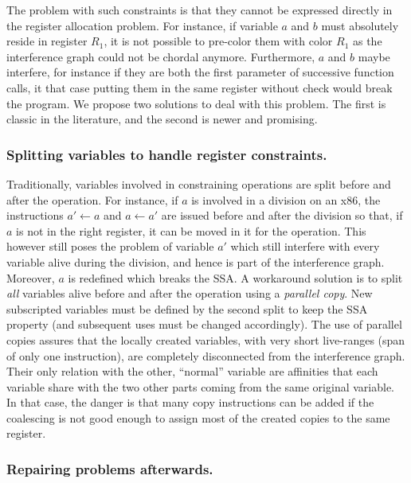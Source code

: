 {The problem with such constraints is that they cannot be expressed directly in 
the register allocation problem. For instance, if variable $a$ and $b$ must 
absolutely reside in register $R_1$, it is not possible to pre-color them with 
color $R_1$ as the interference graph could not be chordal anymore.  
Furthermore, $a$ and $b$ maybe interfere, for instance if they are both the 
first parameter of successive function calls, it that case putting them in the 
same register without check would break the program. We propose two solutions 
to deal with this problem. The first is classic in the literature, and the 
second is newer and promising.


\subsubsection{Splitting variables to handle register constraints.}

Traditionally, variables involved in constraining operations are split before 
and after the operation. For instance, if $a$ is involved in a division on an 
x86, the instructions $a'\gets a$ and $a\gets a'$ are issued before and after 
the division so that, if $a$ is not in the right register, it can be moved in 
it for the operation. This however still poses the problem of variable $a'$ 
which still interfere with every variable alive during the division, and hence 
is part of the interference graph. Moreover, $a$ is redefined which breaks the 
SSA. A workaround solution is to split \emph{all} variables alive before and 
after the operation using a \emph{parallel copy}. New subscripted variables 
must be defined by the second split to keep the SSA property (and subsequent 
uses must be changed accordingly). The use of parallel copies assures that 
the locally created variables, with very short live-ranges (span of only one 
instruction), are completely disconnected from the interference graph. Their 
only relation with the other, ``normal'' variable are affinities that each 
variable share with the two other parts coming from the same original variable.
In that case, the danger is that many copy instructions can be added if the 
coalescing is not good enough to assign most of the created copies to the same 
register.


\subsubsection{Repairing problems afterwards.}

}
